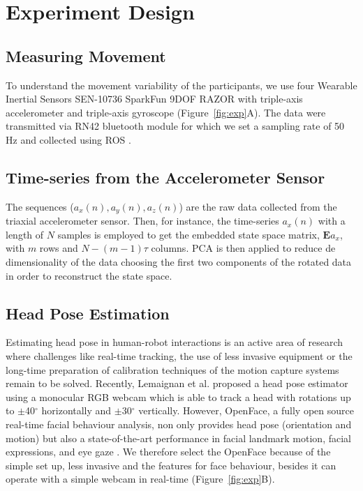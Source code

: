 \documentclass{sigchi}
\begin{document}
\section{Experiment Design}

\subsection{Measuring Movement}
To understand the movement variability of the participants, we use
four Wearable Inertial Sensors SEN-10736 SparkFun 9DOF RAZOR
with triple-axis accelerometer and triple-axis gyroscope (Figure~\ref{fig:exp}A).
The data were transmitted via RN42 bluetooth module
for which we set a sampling rate of 50 Hz and collected using ROS \cite{quigley2009}.

\subsection{Time-series from the Accelerometer Sensor}
The sequences ($a_x(n),a_y(n),a_z(n)$) are the raw data collected from the
triaxial accelerometer sensor. Then, for instance, the time-series $a_x(n)$
with a length of $N$ samples is employed to get the embedded state space matrix,
$\boldsymbol{E} a_{x}$, with $m$ rows and $N-(m-1)\tau$ columns.
PCA is then applied to reduce de dimensionality of the data choosing the first
two components of the rotated data in order to reconstruct the state space.


\subsection{Head Pose Estimation}
Estimating head pose in human-robot interactions is an active area of research
where challenges like real-time tracking, the use of less invasive equipment
or the long-time preparation of calibration techniques of the motion capture
systems remain to be solved. Recently, Lemaignan et al. \cite{Lemaignan2016}
proposed a head pose estimator using a monocular RGB webcam which is able to
track a head with rotations up to $\pm$40$^{\circ}$ horizontally and
$\pm$30$^{\circ}$ vertically.
However, OpenFace, a fully open source real-time facial behaviour analysis,
non only provides head pose (orientation and motion) but also a state-of-the-art
performance in facial landmark motion, facial expressions, and eye gaze
\cite{Baltrusaitis2016}.
We therefore select the OpenFace because of the simple set up, less invasive and
the features for face behaviour, besides it can operate with a simple webcam in
real-time (Figure~\ref{fig:exp}B).
\end{document}
